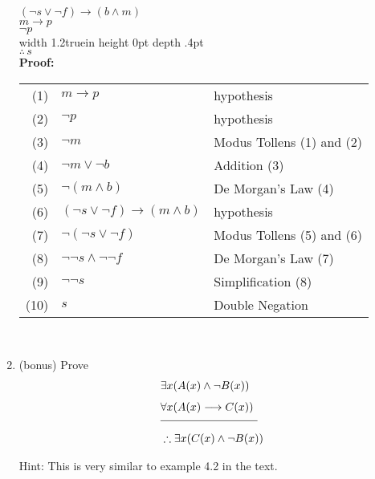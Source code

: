 \documentclass[11pt]{amsart}
\begin{document}
\begin{enumerate}
{\color{blue}
\\
$(\lnot s \lor \lnot f)\rightarrow (b \land m)$\\
$m \rightarrow p$\\
$\lnot p$\\
\vrule width 1.2truein height 0pt depth .4pt\\[4pt]
$\therefore \, s$\\[3pt]
\textbf{Proof:}
 \begin{tabular}[t]{r l l}
 (1)& $m\rightarrow p$                   & hypothesis\\
 (2)& $ \lnot p$      & hypothesis\\
 (3)& $\lnot m$                   & Modus Tollens (1) and (2)\\
 (4)& $\lnot m \lor \lnot b$ & Addition (3)\\
 (5)& $\lnot(m\land b)$ & De Morgan's Law (4)\\
 (6)& $(\lnot s \lor \lnot f)\rightarrow (m \land b)$              & hypothesis\\
 (7)& $\lnot(\lnot s \lor \lnot f)$             & Modus Tollens (5) and (6)\\
 (8)& $\lnot\lnot s \land \lnot\lnot f$             & De Morgan's Law (7)\\
 (9)& $\lnot\lnot s$                   & Simplification (8)\\
 (10)& $s$            & Double Negation
 \end{tabular}\\[5pt]
}

\vfill\break

\item (bonus) Prove
\begin{align*}
&\exists{x}(A(x)\land\neg B(x))\\[4pt]
&\forall{x}(A(x) \longrightarrow C(x))\\[4pt]
\noalign{\kern -10pt}
&\vrule width 1.2truein height 0pt depth .4pt\\[4pt] 
&\therefore \exists{x}(C(x)\land \neg B(x))\\[4pt]
\end{align*}
Hint: This is very similar to example 4.2 in the text.\\[5pt]


\end{enumerate}
\end{document}
